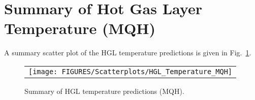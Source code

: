 \section{Summary of Hot Gas Layer Temperature (MQH)}

A summary scatter plot of the HGL temperature predictions is given in Fig.~\ref{hgl_temperature_MQH_summary}. 

\begin{figure}[p]
\begin{center}
\begin{tabular}{l}
\texttt{[image: FIGURES/Scatterplots/HGL\_Temperature\_MQH]}
\end{tabular}
\end{center}
\caption[Summary of HGL temperature predictions (MQH).]
{Summary of HGL temperature predictions (MQH).}
\label{hgl_temperature_MQH_summary}
\end{figure}



